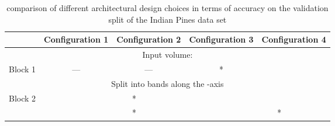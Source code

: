 \documentclass[journal]{IEEEtran}
\begin{document}
\begin{table*}
\centering
\caption{comparison of different architectural design choices in terms of accuracy on the validation split of the Indian Pines data set}
\label{table:IndianPines_arch}
\begin{tabular}{c|c|c|c|c|c|c|c|c|}
\cline{2-9}
                                               & \multicolumn{2}{c|}{Configuration 1}                                                             & \multicolumn{2}{c|}{Configuration 2}                                                                  & \multicolumn{2}{c|}{Configuration 3}                                                                & \multicolumn{2}{c|}{Configuration 4}                                                                 \\ \hline
\multicolumn{9}{|c|}{Input volume: }                                                                                                                                                                                                                                                                                                                                                                                                              \\ \hline
\multicolumn{1}{|c|}{Block 1}                  & \multicolumn{2}{c|}{---}                                                                         & \multicolumn{2}{c|}{---}                                                                              & \multicolumn{2}{c|}{*}                                                             & \multicolumn{2}{c|}{}                                                               \\ \hline
\multicolumn{9}{|c|}{Split into  bands along the -axis}                                                                                                                                                                                                                                                                                                                                                                                                  \\ \hline
\multicolumn{1}{|c|}{\multirow{4}{*}{Block 2}} &           & \multirow{4}{*}{} & * & \multirow{4}{*}{} &  & \multirow{4}{*}{
} &   & \multirow{4}{*}{} \\ \cline{2-2} \cline{4-4} \cline{6-6} \cline{8-8}
\multicolumn{1}{|c|}{}                         &           &                                                                              & * &                                                                              &  &                                                                             & * &                                                                             \\ \cline{2-2} \cline{4-4} \cline{6-6} \cline{8-8}

\end{tabular}
\end{table*}
\end{document}
